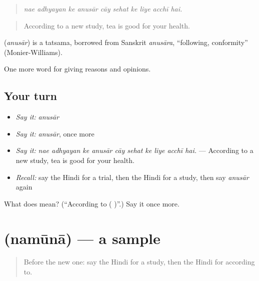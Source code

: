 \begin{quote}
\emph{nae adhyayan ke anusār cāy sehat ke liye acchī hai.}
\end{quote}

\begin{quote}
According to a new study, tea is good for your health.
\end{quote}

\begin{cousinweb}
\textbf{} (\emph{anusār}) is a tatsama, borrowed from Sanskrit \emph{anusāra}, \textquotedblleft{}following, conformity\textquotedblright{} (Monier-Williams).
\end{cousinweb}

\begin{grammarlens}[title={What you've built}]
One more word for giving reasons and opinions.
\end{grammarlens}

\subsection*{Your turn}
\begin{itemize}
\raggedright
  \item \emph{Say it:} \emph{anusār}
  \item \emph{Say it:} \emph{anusār}, once more
  \item \emph{Say it:} \emph{nae adhyayan ke anusār cāy sehat ke liye acchī hai.} — According to a new study, tea is good for your health.
  \item \emph{Recall:} say the Hindi for a trial, then the Hindi for a study, then say \emph{anusār} again
\end{itemize}

\begin{tcolorbox}[breakable,colback=teal!4,colframe=teal!35!black,title={Before you move on}]
What does  mean? (\textquotedblleft{}According to ( )\textquotedblright{}.) Say it once more.
\end{tcolorbox}
\section[\texorpdfstring{\hi{नमूना} (namūnā)}{नमूना (namūnā)}]{ (namūnā) — a sample}

\label{lesson:HI-C363-namuna}



\begin{quote}
Before the new one: say the Hindi for a study, then the Hindi for according to.
\end{quote}

